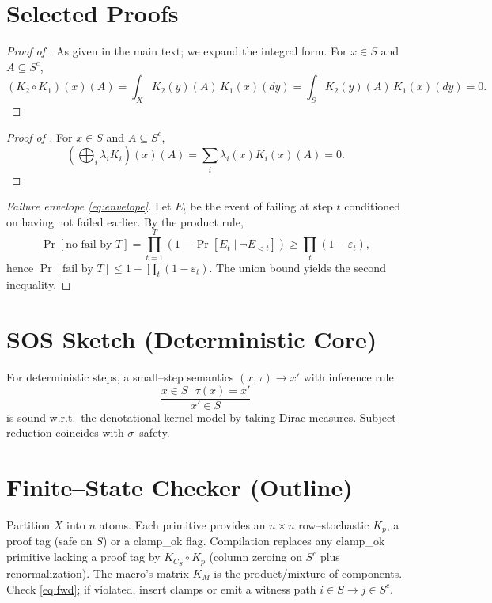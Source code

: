 \documentclass[11pt]{article}
\theoremstyle{definition}
\theoremstyle{plain}
\theoremstyle{remark}
\newcommand{\X}{X}
\newcommand{\1}{\mathbf{1}}
\newcommand{\clamp}{C}
\begin{document}
\appendix

\section{Selected Proofs}
\begin{proof}[Proof of ]
As given in the main text; we expand the integral form. For $x\in S$ and $A\subseteq S^c$,
\[(K_2\circ K_1)(x)(A)=\int_{\X} K_2(y)(A)\,K_1(x)(dy)=\int_{S} K_2(y)(A)\,K_1(x)(dy)=0.\]
\end{proof}

\begin{proof}[Proof of ]
For $x\in S$ and $A\subseteq S^c$,
\[\left(\bigoplus_i \lambda_i K_i\right)(x)(A)=\sum_i \lambda_i(x) K_i(x)(A)=0.\]
\end{proof}

\begin{proof}[Failure envelope \eqref{eq:envelope}]
Let $E_t$ be the event of failing at step $t$ conditioned on having not failed earlier. By the product rule,
\[\Pr[\text{no fail by }T]=\prod_{t=1}^T (1-\Pr[E_t\mid \neg E_{<t}]) \ge \prod_t (1-\varepsilon_t),\]
hence $\Pr[\text{fail by }T]\le 1-\prod_t (1-\varepsilon_t)$. The union bound yields the second inequality.
\end{proof}

\section{SOS Sketch (Deterministic Core)}
For deterministic steps, a small--step semantics $(x,\tau)\to x'$ with inference rule
\[\frac{x\in S\ \ \ \tau(x)=x'}{x'\in S}\]
is sound w.r.t.\ the denotational kernel model by taking Dirac measures. Subject reduction coincides with $\sigma$--safety.

\section{Finite--State Checker (Outline)}
Partition $\X$ into $n$ atoms. Each primitive provides an $n\times n$ row--stochastic $K_p$, a proof tag (\textsf{safe} on $S$) or a \textsf{clamp\_ok} flag. Compilation replaces any \textsf{clamp\_ok} primitive lacking a proof tag by $K_{\clamp_S}\circ K_p$ (column zeroing on $S^c$ plus renormalization). The macro's matrix $K_M$ is the product/mixture of components. Check \eqref{eq:fwd}; if violated, insert clamps or emit a witness path $i\in S \to j\in S^c$.
\end{document}
